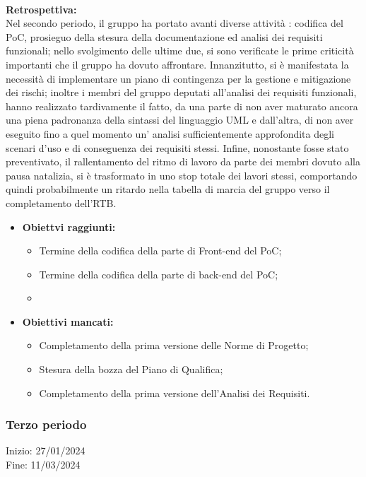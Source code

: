 \paragraph{}
\textbf{Retrospettiva:} \\
Nel secondo periodo, il gruppo ha portato avanti diverse attività : codifica del PoC, prosieguo della stesura della documentazione ed analisi dei requisiti funzionali; nello svolgimento delle ultime due, si sono verificate 
le prime criticità importanti che il gruppo ha dovuto affrontare. Innanzitutto,  si è manifestata la necessità di implementare un piano di contingenza per la gestione e mitigazione dei rischi; inoltre i membri del gruppo deputati
all'analisi dei requisiti funzionali, hanno realizzato tardivamente il fatto, da una parte di non aver maturato ancora una piena padronanza della sintassi del linguaggio UML e dall'altra, di non aver eseguito fino a quel 
momento un' analisi sufficientemente approfondita degli scenari d'uso e di conseguenza dei requisiti stessi. Infine, nonostante fosse stato preventivato, il rallentamento del ritmo di lavoro da parte dei membri
dovuto alla pausa natalizia, si è trasformato in uno stop totale dei lavori stessi, comportando quindi probabilmente un ritardo nella tabella di marcia del gruppo verso il completamento dell'RTB.
\begin{itemize} 
\item \textbf{Obiettvi raggiunti:}
    \begin{itemize}
        \item Termine della codifica della parte di Front-end del PoC;
        \item Termine della codifica della parte di back-end del PoC;
        \item
    \end{itemize}
    \item \textbf{Obiettivi mancati:}
    \begin{itemize}
        \item Completamento della prima versione delle Norme di Progetto;
        \item Stesura della bozza del Piano di Qualifica;
        \item Completamento della prima versione dell'Analisi dei Requisiti.
    \end{itemize}
\end{itemize}

\subsubsection{Terzo periodo}
Inizio: 27/01/2024 \\
Fine: 11/03/2024 \\


